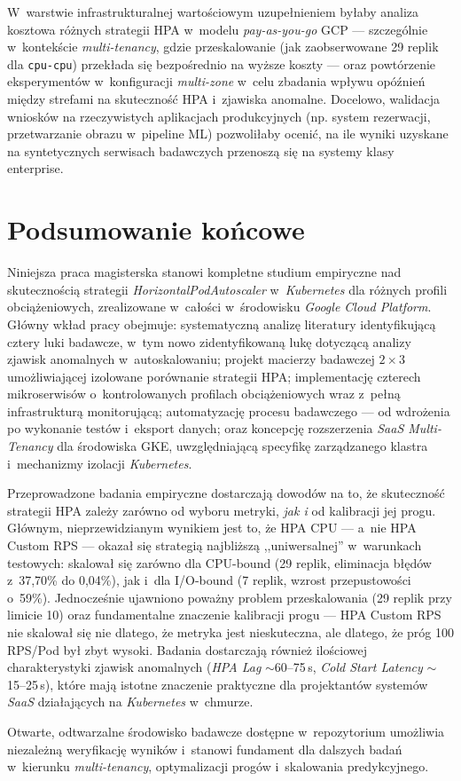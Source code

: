 W~warstwie infrastrukturalnej wartościowym uzupełnieniem byłaby analiza kosztowa różnych strategii HPA w~modelu \textit{pay-as-you-go} GCP — szczególnie w~kontekście \textit{multi-tenancy}, gdzie przeskalowanie (jak zaobserwowane 29 replik dla \texttt{cpu-cpu}) przekłada się bezpośrednio na wyższe koszty — oraz powtórzenie eksperymentów w~konfiguracji \textit{multi-zone} w~celu zbadania wpływu opóźnień między strefami na skuteczność HPA i~zjawiska anomalne. Docelowo, walidacja wniosków na rzeczywistych aplikacjach produkcyjnych (np. system rezerwacji, przetwarzanie obrazu w~pipeline ML) pozwoliłaby ocenić, na ile wyniki uzyskane na syntetycznych serwisach badawczych przenoszą się na systemy klasy enterprise.

\section{Podsumowanie końcowe}

Niniejsza praca magisterska stanowi kompletne studium empiryczne nad skutecznością strategii \textit{HorizontalPodAutoscaler} w~\textit{Kubernetes} dla różnych profili obciążeniowych, zrealizowane w~całości w~środowisku \textit{Google Cloud Platform}. Główny wkład pracy obejmuje: systematyczną analizę literatury identyfikującą cztery luki badawcze, w~tym nowo zidentyfikowaną lukę dotyczącą analizy zjawisk anomalnych w~autoskalowaniu; projekt macierzy badawczej $2 \times 3$ umożliwiającej izolowane porównanie strategii HPA; implementację czterech mikroserwisów o~kontrolowanych profilach obciążeniowych wraz z~pełną infrastrukturą monitorującą; automatyzację procesu badawczego — od wdrożenia po wykonanie testów i~eksport danych; oraz koncepcję rozszerzenia \textit{SaaS Multi-Tenancy} dla środowiska GKE, uwzględniającą specyfikę zarządzanego klastra i~mechanizmy izolacji \textit{Kubernetes}.

Przeprowadzone badania empiryczne dostarczają dowodów na to, że skuteczność strategii HPA zależy zarówno od wyboru metryki, \textit{jak i} od kalibracji jej progu. Głównym, nieprzewidzianym wynikiem jest to, że HPA CPU — a~nie HPA Custom RPS — okazał się strategią najbliższą ,,uniwersalnej'' w~warunkach testowych: skalował się zarówno dla CPU-bound (29 replik, eliminacja błędów z~37,70\% do 0,04\%), jak i~dla I/O-bound (7 replik, wzrost przepustowości o~59\%). Jednocześnie ujawniono poważny problem przeskalowania (29 replik przy limicie 10) oraz fundamentalne znaczenie kalibracji progu — HPA Custom RPS nie skalował się nie dlatego, że metryka jest nieskuteczna, ale dlatego, że próg 100 RPS/Pod był zbyt wysoki. Badania dostarczają również ilościowej charakterystyki zjawisk anomalnych (\textit{HPA Lag} $\sim$60--75\,s, \textit{Cold Start Latency} $\sim$15--25\,s), które mają istotne znaczenie praktyczne dla projektantów systemów \textit{SaaS} działających na \textit{Kubernetes} w~chmurze.

Otwarte, odtwarzalne środowisko badawcze dostępne w~repozytorium umożliwia niezależną weryfikację wyników i~stanowi fundament dla dalszych badań w~kierunku \textit{multi-tenancy}, optymalizacji progów i~skalowania predykcyjnego.
